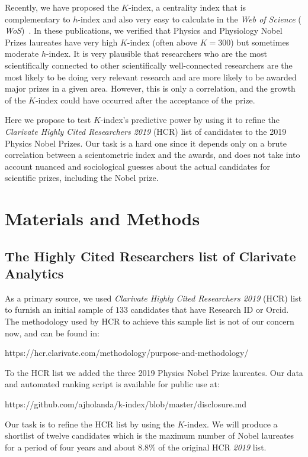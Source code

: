 \documentclass[final,3p,times]{elsarticle}
\begin{document}
Recently, we have proposed the $K$-index,  a centrality index that is complementary to $h$-index and also very easy to calculate 
in the {\em Web of Science} ({\em
WoS})~\cite{kinouchi2018,kinouchi2018k}.  In these publications, we
verified that Physics and Physiology Nobel Prizes laureates have very
high $K$-index (often above $K=300$) but sometimes moderate
$h$-index. It is very plausible that researchers who are the most scientifically connected to other scientifically well-connected researchers are the  most likely to be doing very relevant research and are more likely to be awarded major prizes in a given area. However, this is only a correlation, and the growth of the
$K$-index could have occurred after the acceptance of the prize.

Here we propose to test  $K$-index's  predictive power by using
it to refine the {\em Clarivate Highly Cited Researchers
2019} (HCR) list of candidates to the 2019 Physics Nobel Prizes.
Our task is a hard one since it depends only on a brute 
correlation between a scientometric index and the awards, and does not
take into account nuanced and sociological guesses about the actual 
candidates for scientific prizes, including the Nobel prize.

\section{Materials and Methods}

\subsection{The Highly Cited Researchers list of
Clarivate Analytics}
\label{SS:2.1}

As a primary source, we used {\em Clarivate Highly Cited Researchers
  2019} (HCR) list to furnish an initial sample of $133$ candidates
that have Research ID or Orcid.  The methodology used by HCR to
achieve this sample list is not of our concern now, and can be found in:

https://hcr.clarivate.com/methodology/purpose-and-methodology/ 

To the HCR list we added the three 2019 Physics Nobel Prize laureates.
Our data and automated ranking script is available for public use at:

https://github.com/ajholanda/k-index/blob/master/disclosure.md

Our task is to refine the HCR list by using the $K$-index.  We will
produce a shortlist of twelve candidates which is the maximum number
of Nobel laureates for a period of four years and about $8.8\%$ of the
original HCR {\em 2019} list.
\end{document}
